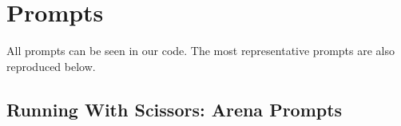 \documentclass{article} %
\begin{document}

\section{Prompts}

All prompts can be seen in our code. The most representative prompts are also reproduced below.

\subsection{Running With Scissors: Arena Prompts}
\end{document}
